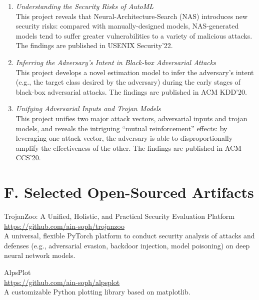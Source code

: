 \documentclass{resume}
\begin{document}
\begin{resume}
\begin{enumerate}[labelsep=18pt, parsep=8pt]
\item {\em Understanding the Security Risks of AutoML}\\
This project reveals that Neural-Architecture-Search (NAS) introduces new security risks: compared with manually-designed models, NAS-generated models tend to suffer greater vulnerabilities to a variety of malicious attacks. The findings are published in USENIX Security'22. 

\item {\em Inferring the Adversary's Intent in Black-box Adversarial Attacks}\\
This project develops a novel estimation model to infer the adversary's intent (e.g., the target class desired by the adversary) during the early stages of black-box adversarial attacks. The findings are published in ACM KDD'20. 

\item {\em Unifying Adversarial Inputs and Trojan Models}\\
This project unifies two major attack vectors, adversarial inputs and trojan models, and reveals the intriguing ``mutual reinforcement'' effects: by leveraging one attack vector, the adversary is able to disproportionally amplify the effectiveness of the other. The findings are published in ACM CCS'20. 

\end{enumerate}

\vspace{0.2in} 
\section{F. Selected Open-Sourced Artifacts}
\vspace{8pt}



TrojanZoo: A Unified, Holistic, and Practical Security Evaluation Platform\\
\url{https://github.com/ain-soph/trojanzoo} \\
A universal, flexible PyTorch platform to conduct security analysis of attacks and defenses (e.g., adversarial evasion, backdoor injection, model poisoning) on deep neural network models. 

AlpsPlot \\
\url{https://github.com/ain-soph/alpsplot} \\
A customizable Python plotting library based on matplotlib.



\end{resume}
\end{document}
